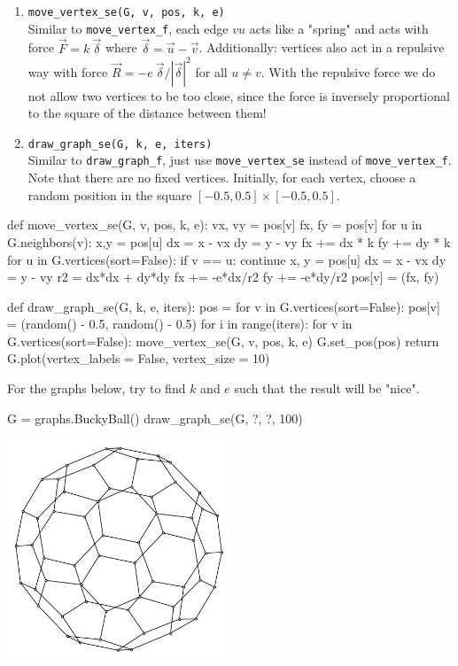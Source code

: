 \begin{enumerate}
    \item \verb|move_vertex_se(G, v, pos, k, e)|\\
    Similar to \verb|move_vertex_f|, each edge $vu$ acts like a "spring" and acts with force $
    \vec{F} = k\: \vec{\delta}$ where $\vec{\delta} = \vec{u} - \vec{v}$. Additionally: vertices also act in a repulsive way with force $\vec{R} = -e\: \vec{\delta}/|\vec{\delta}|^2$ for all $u \neq v$. With the repulsive force we do not allow two vertices to be too close, since the force is inversely proportional to the square of the distance between them!
    \item \verb|draw_graph_se(G, k, e, iters)|\\
    Similar to \verb|draw_graph_f|, just use \verb|move_vertex_se| instead of \verb|move_vertex_f|. Note that there are no fixed vertices. Initially, for each vertex, choose a random position in the square $[-0.5, 0.5] \times [-0.5, 0.5]$.
\end{enumerate}

\medskip
\begin{sageCell}
    def move_vertex_se(G, v, pos, k, e):
    vx, vy = pos[v]
    fx, fy = pos[v]
    for u in G.neighbors(v):
        x,y = pos[u]
        dx = x - vx
        dy = y - vy
        fx += dx * k
        fy += dy * k
    for u in G.vertices(sort=False):
        if v == u:
            continue
        x, y = pos[u]
        dx = x - vx
        dy = y - vy
        r2 = dx*dx + dy*dy
        fx += -e*dx/r2
        fy += -e*dy/r2
    pos[v] = (fx, fy)


def draw_graph_se(G, k, e, iters):
    pos = {}
    for v in G.vertices(sort=False):
        pos[v] = (random() - 0.5, random() - 0.5)
    for i in range(iters):
        for v in G.vertices(sort=False):
            move_vertex_se(G, v, pos, k, e)
    G.set_pos(pos)
    return G.plot(vertex_labels = False, vertex_size = 10)
\end{sageCell}

For the graphs below, try to find $k$ and $e$ such that the result will be "nice".

\begin{sageCell}
    G = graphs.BuckyBall()
    draw_graph_se(G, ?, ?, 100)
\end{sageCell}
\begin{outImage}
    \includegraphics[width=0.5\textwidth]{Images/Drawing/bucky_ball_se_100.png}
\end{outImage}

